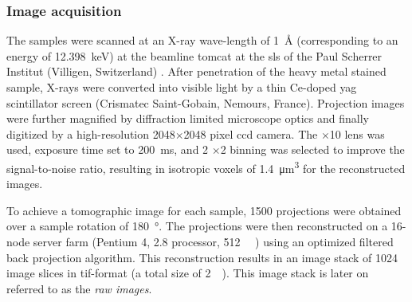 \subsubsection{Image acquisition}
The samples were scanned at an X-ray wave-length of \SI{1}{\angstrom} (corresponding to an energy of \SI{12.398}{\kilo\electronvolt}) at the beamline \ac{tomcat} at the \acf{sls} of the Paul Scherrer Institut (Villigen, Switzerland) \cite{Stampanoni2002,Stampanoni2007}. After penetration of the heavy metal stained sample, X-rays were converted into visible light by a thin Ce-doped \acs{yag} scintillator screen (Crismatec Saint-Gobain, Nemours, France). Projection images were further magnified by diffraction limited microscope optics and finally digitized by a high-resolution 2048$\times$2048 pixel \ac{ccd} camera. The $\times$10 lens was used, exposure time set to \SI{200}{\milli\second}, and 2 $\times$2 binning was selected to improve the signal-to-noise ratio, resulting in isotropic voxels of \SI{1.4}{\micro\meter\cubed} for the reconstructed images.

To achieve a tomographic image for each sample, 1500 projections were obtained over a sample rotation of \SI{180}{\degree}. The projections were then reconstructed on a 16-node server farm (Pentium 4, \SI{2.8}{\gigahertz} processor, \SI{512}{\mega\byte} ) using an optimized filtered back projection algorithm. This reconstruction results in an image stack of 1024 image slices in tif-format (a total size of \SI{2}{\giga\byte}). This image stack is later on referred to as the \emph{raw images}.

